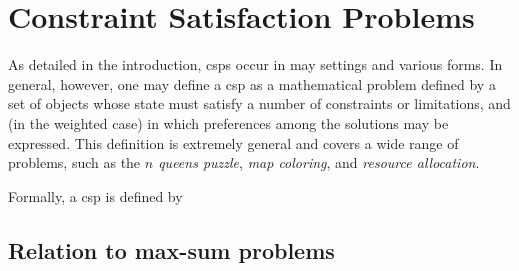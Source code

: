 \section{Constraint Satisfaction Problems}
As detailed in the introduction, \glspl{csp} occur in may settings and 
various forms. In general, however, one may define a \gls{csp} as a
mathematical problem defined by a set of objects whose state must
satisfy a number of constraints or limitations, and (in the weighted case)
in which preferences among the solutions may be expressed.
This definition is extremely general and covers a wide range of problems,
such as the \emph{\(n\) queens puzzle}, \emph{map coloring}, and
\emph{resource allocation}.

Formally, a \gls{csp} is defined by 


\subsection{Relation to max-sum problems}
\textcite{Werner07}
